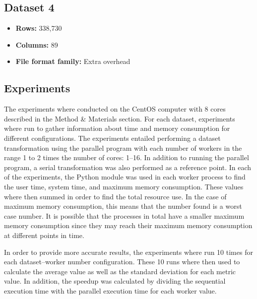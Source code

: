 \subsection{Dataset 4}
\begin{itemize}
  \item \textbf{Rows:} 338,730
  \item \textbf{Columns:} 89
  \item \textbf{File format family:} Extra overhead
\end{itemize}

\subsection{Experiments}
The experiments where conducted on the CentOS computer with 8 cores described in the Method \& Materials section.
For each dataset, experiments where run to gather information about time and memory consumption for different configurations.
The experiments entailed performing a dataset transformation using the parallel program with each number of workers in the range 1 to 2 times the number of cores: 1--16.
In addition to running the parallel program, a serial transformation was also performed as a reference point.
In each of the experiments, the Python  module was used in each worker process to find the user time, system time, and maximum memory consumption.
These values where then summed in order to find the total resource use. In the case of maximum memory consumption, this means that the number found is a worst case
number. It is possible that the processes in total have a smaller maximum memory consumption since they may reach their maximum memory consumption at different
points in time.

In order to provide more accurate results, the experiments where run 10 times for each dataset--worker number configuration. These 10 runs where then used to calculate the
average value as well as the standard deviation for each metric value. In addition, the speedup was calculated by dividing the sequential execution time with the parallel execution
time for each worker value.
